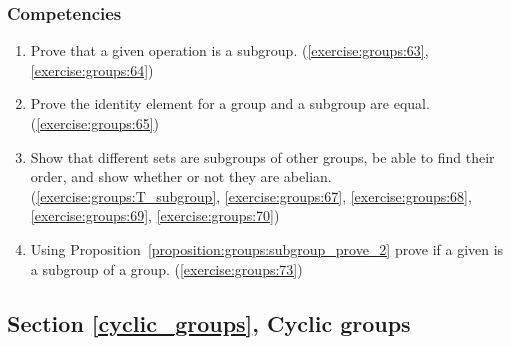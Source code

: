 \subsubsection*{Competencies}
\begin{enumerate}
\item
Prove that a given operation is a subgroup. (\ref{exercise:groups:63}, \ref{exercise:groups:64})

\item
Prove the identity element for a group and a subgroup are equal.  (\ref{exercise:groups:65})

\item
Show that different sets are subgroups of other groups, be able to find their order, and show whether or not they are abelian. (\ref{exercise:groups:T_subgroup}, \ref{exercise:groups:67}, \ref{exercise:groups:68}, \ref{exercise:groups:69}, \ref{exercise:groups:70})

\item
Using Proposition~\ref{proposition:groups:subgroup_prove_2} prove if a given is a subgroup of a group. (\ref{exercise:groups:73})
\end{enumerate}


\subsection*{Section \ref{cyclic_groups}, Cyclic groups}

